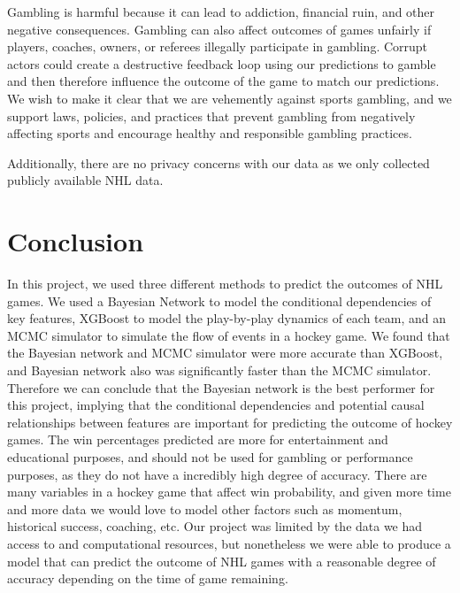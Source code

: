 \documentclass[11pt]{article}
\begin{document}
Gambling is harmful because it can lead to addiction, financial ruin, and other negative consequences. Gambling can also affect outcomes of games unfairly if players, coaches, owners, or referees illegally participate in gambling. Corrupt actors could create a destructive feedback loop using our predictions to gamble and then therefore influence the outcome of the game to match our predictions.
We wish to make it clear that we are vehemently against sports gambling, and we support laws, policies, and practices that prevent gambling from negatively affecting sports and encourage healthy and responsible gambling practices.

Additionally, there are no privacy concerns with our data as we only collected publicly available NHL data.

\section{Conclusion}

In this project, we used three different methods to predict the outcomes of NHL games. We used a Bayesian Network to model the conditional dependencies of key features, XGBoost to model the play-by-play dynamics of each team, and an MCMC simulator to simulate the flow of events in a hockey game. 
We found that the Bayesian network and MCMC simulator were more accurate than XGBoost, and Bayesian network also was significantly faster than the MCMC simulator. Therefore we can conclude that the Bayesian network is the best performer for this project, implying that the conditional dependencies and potential causal relationships between features are important for predicting the outcome of hockey games.
The win percentages predicted are more for entertainment and educational purposes, and should not be used for gambling or performance purposes, as they do not have a incredibly high degree of accuracy. There are many variables in a hockey game that affect win probability, and given more time and more data we would love to model other factors such as momentum, historical success, coaching, etc. Our project was limited by the data
we had access to and computational resources, but nonetheless we were able to produce a model that can predict the outcome of NHL games with a reasonable degree of accuracy depending on the time of game remaining.

\newpage


\end{document}
